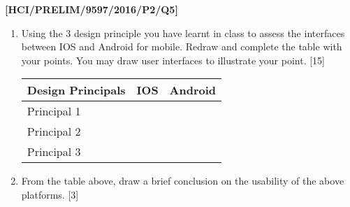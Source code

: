 \item \textbf{{[}HCI/PRELIM/9597/2016/P2/Q5{]} }
\begin{enumerate}
\item Using the 3 design principle you have learnt in class to assess the
interfaces between IOS and Android for mobile. Redraw and complete
the table with your points. You may draw user interfaces to illustrate
your point. \hfill{}{[}15{]}
\noindent \begin{center}
\begin{tabular}{|l|c|c|}
\hline 
Design Principals & IOS & Android\tabularnewline
\hline 
Principal 1 &  & \tabularnewline
\hline 
Principal 2 &  & \tabularnewline
\hline 
Principal 3  &  & \tabularnewline
\hline 
\end{tabular}
\par\end{center}
\item From the table above, draw a brief conclusion on the usability of
the above platforms.\hfill{} {[}3{]}
\end{enumerate}